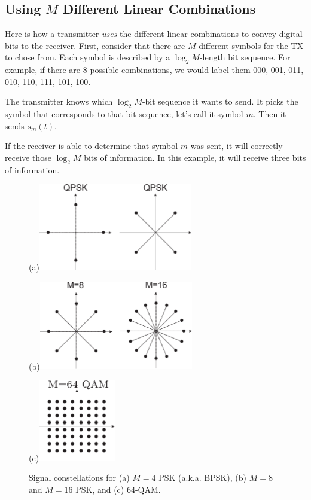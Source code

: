\subsection{Using $M$ Different Linear Combinations}

Here is how a transmitter \emph{uses} the different linear combinations to convey digital bits to the receiver.  First, consider that there are $M$ different symbols for the TX to chose from.  Each symbol is described by a $\log_2 M$-length bit sequence.  For example, if there are $8$ possible combinations, we would label them 000, 001, 011, 010, 110, 111, 101, 100.  

The transmitter knows which $\log_2 M$-bit sequence it wants to send.  It picks the symbol that corresponds to that bit sequence, let's call it symbol $m$.  Then it sends $s_m(t)$.  

If the receiver is able to determine that symbol $m$ was sent, it will correctly receive those $\log_2 M$ bits of information.  In this example, it will receive three bits of information.


\begin{figure}[htbp]
  \centerline{(a)\includegraphics[width=0.6\textwidth]{../images/QPSK-signalSpaceDiagram.eps}
  }
  \centerline{(b)\includegraphics[width=0.6\textwidth]{../images/MPSK-signalSpaceDiagram.eps} }
  \centerline{(c)\includegraphics[width=0.3\textwidth]{../images/QAM64Eg.eps} }
  \caption{Signal constellations for (a) $M=4$ PSK (a.k.a. BPSK), (b) $M=8$ and $M=16$ PSK, and (c) 64-QAM.}
  \label{F:MPSKEg}
\end{figure}

